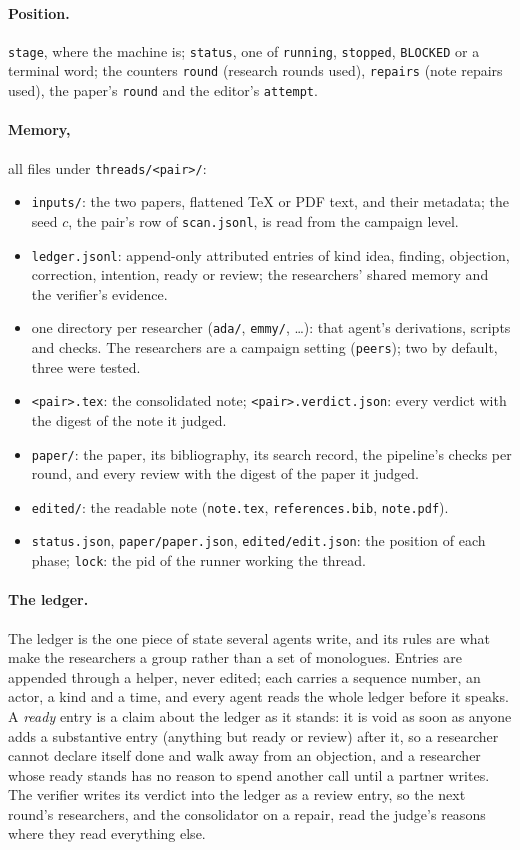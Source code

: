 \documentclass[11pt,a4paper]{article}
\newcommand{\file}[1]{\texttt{#1}}
\begin{document}
\paragraph{Position.} \file{stage}, where the machine is; \file{status}, one of \file{running},
\file{stopped}, \file{BLOCKED} or a terminal word; the counters \file{round} (research rounds
used), \file{repairs} (note repairs used), the paper's \file{round} and the editor's
\file{attempt}.

\paragraph{Memory,} all files under \file{threads/<pair>/}:
\begin{itemize}\setlength{\itemsep}{1pt}
  \item \file{inputs/}: the two papers, flattened \TeX{} or PDF text, and their metadata; the
    seed $c$, the pair's row of \file{scan.jsonl}, is read from the campaign level.
  \item \file{ledger.jsonl}: append-only attributed entries of kind idea, finding, objection,
    correction, intention, ready or review; the researchers' shared memory and the verifier's
    evidence.
  \item one directory per researcher (\file{ada/}, \file{emmy/}, \ldots): that agent's
    derivations, scripts and checks. The researchers are a campaign setting (\file{peers}); two
    by default, three were tested.
  \item \file{<pair>.tex}: the consolidated note; \file{<pair>.verdict.json}: every verdict with
    the digest of the note it judged.
  \item \file{paper/}: the paper, its bibliography, its search record, the pipeline's checks per
    round, and every review with the digest of the paper it judged.
  \item \file{edited/}: the readable note (\file{note.tex}, \file{references.bib},
    \file{note.pdf}).
  \item \file{status.json}, \file{paper/paper.json}, \file{edited/edit.json}: the position of
    each phase; \file{lock}: the pid of the runner working the thread.
\end{itemize}

\paragraph{The ledger.} The ledger is the one piece of state several agents write, and its
rules are what make the researchers a group rather than a set of monologues. Entries are
appended through a helper, never edited; each carries a sequence number, an actor, a kind and a
time, and every agent reads the whole ledger before it speaks. A \emph{ready} entry is a claim
about the ledger as it stands: it is void as soon as anyone adds a substantive entry (anything
but ready or review) after it, so a researcher cannot declare itself done and walk away from
an objection, and a researcher whose ready stands has no reason to spend another call until a
partner writes. The verifier writes its verdict into the ledger as a review entry, so the next
round's researchers, and the consolidator on a repair, read the judge's reasons where they read
everything else.
\end{document}
